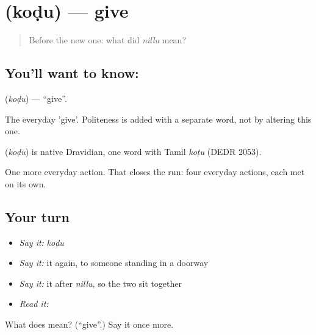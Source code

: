 \section[\texorpdfstring{\kn{ಕೊಡು} (koḍu)}{ಕೊಡು (koḍu)}]{ (koḍu) — give}

\label{lesson:KA-C43-give}



\begin{quote}
Before the new one: what did \emph{nillu} mean?
\end{quote}

\subsection*{You'll want to know: }
\textbf{} (\emph{koḍu}) — \textquotedblleft{}give\textquotedblright{}.

The everyday 'give'. Politeness is added with a separate word, not by altering this one.

\begin{cousinweb}
\textbf{} (\emph{koḍu}) is native Dravidian, one word with Tamil \emph{koṭu} (DEDR 2053).
\end{cousinweb}

\begin{grammarlens}[title={What you've built}]
One more everyday action. That closes the run: four everyday actions, each met on its own.
\end{grammarlens}

\subsection*{Your turn}
\begin{itemize}
\raggedright
  \item \emph{Say it:} \emph{koḍu}
  \item \emph{Say it:} it again, to someone standing in a doorway
  \item \emph{Say it:} it after \emph{nillu}, so the two sit together
  \item \emph{Read it:} \textbf{}
\end{itemize}

\begin{tcolorbox}[breakable,colback=teal!4,colframe=teal!35!black,title={Before you move on}]
What does  mean? (\textquotedblleft{}give\textquotedblright{}.) Say it once more.
\end{tcolorbox}
